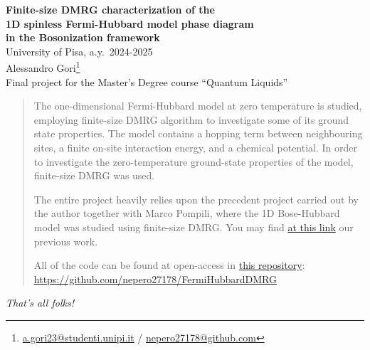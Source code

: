 \documentclass[a4paper]{article}
\begin{document}
\begin{center}
    {\bfseries {\Large Finite-size DMRG characterization of the}} \\[0.8em]
    {\bfseries {\Large 1D spinless Fermi-Hubbard model phase diagram}}\\[0.8em]
    {\bfseries {\Large in the Bosonization framework}} \\[1em]
    \large University of Pisa, a.y.~2024-2025 \\[0.8em]
    Alessandro Gori\footnote{\href{mailto:a.gori23@studenti.unipi.it}{a.gori23@studenti.unipi.it} / \href{https://github.com/nepero27178}{nepero27178@github.com}} \\[0.8em]
    \scriptsize Final project for the Master's Degree course ``Quantum Liquids''
    
\end{center}

\renewcommand*{\thefootnote}{\arabic{footnote}}
\setcounter{footnote}{0}

\begin{abstract}
    The one-dimensional Fermi-Hubbard model at zero temperature is studied, employing finite-size DMRG algorithm to investigate some of its ground state properties. The model contains a hopping term between neighbouring sites, a finite on-site interaction energy, and a chemical potential. In order to investigate the zero-temperature ground-state properties of the model, finite-size DMRG was used. 
    
    The entire project heavily relies upon the precedent project carried out by the author together with Marco Pompili, where the 1D Bose-Hubbard model was studied using finite-size DMRG. You may find \href{https://github.com/mrc-pop/BoseHubbardDMRG}{at this link} our previous work.\\
    \begin{center}
        {\footnotesize All of the code can be found at open-access in \href{https://github.com/nepero27178/FermiHubbardDMRG}{this repository}:\\ \url{https://github.com/nepero27178/FermiHubbardDMRG}}
    \end{center}
\end{abstract}
\tableofcontents

\clearpage







\begin{flushright}
	\textit{That's all folks!}
\end{flushright}

\printbibliography \nocite{*}
\end{document}
